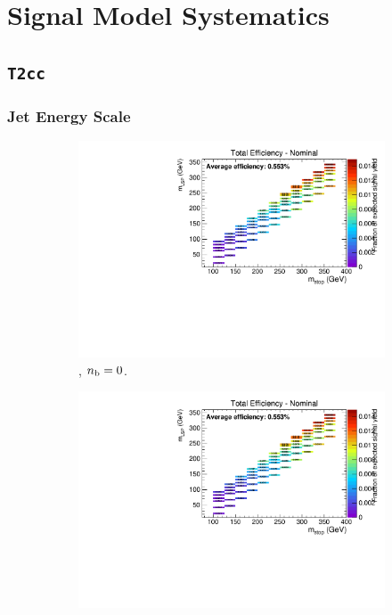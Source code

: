 \chapter{Signal Model Systematics}
\label{ch:app_sig_syst}

\section*{\texttt{T2cc}}
\label{sec:t2cc_syst_plots}

\newpage
\subsection*{Jet Energy Scale}
\label{sec:t2cc_jes_plots}

\begin{figure}[ht!]
  \centering
  \begin{subfigure}[b]{0.32\textwidth}
    \includegraphics[width=\textwidth, page=4]{Figs/sms/t2cc/v24/JES_T2cc_v24_eq0b_le3j_incl.pdf}
    \caption{\njlow, $n_{\text{b}} = 0$.}
  \end{subfigure}
  \begin{subfigure}[b]{0.32\textwidth}
    \includegraphics[width=\textwidth, page=5]{Figs/sms/t2cc/v24/JES_T2cc_v24_eq0b_le3j_incl.pdf}

\end{subfigure}
\end{figure}
